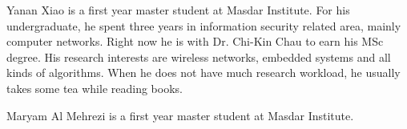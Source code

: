 \documentclass[12pt,journal,compsoc]{IEEEtran}
\begin{document}

\begin{IEEEbiographynophoto}{Yanan Xiao}
is a first year master student at Masdar Institute. For his undergraduate, he spent three years in information security related area, mainly computer networks. Right now he is with Dr. Chi-Kin Chau to earn his MSc degree. His research interests are wireless networks, embedded systems and all kinds of algorithms. When he does not have much research workload, he usually takes some tea while reading books.
\end{IEEEbiographynophoto}

\begin{IEEEbiographynophoto}{Maryam Al Mehrezi}
is a first year master student at Masdar Institute.
\end{IEEEbiographynophoto}


\vfill





\end{document}
